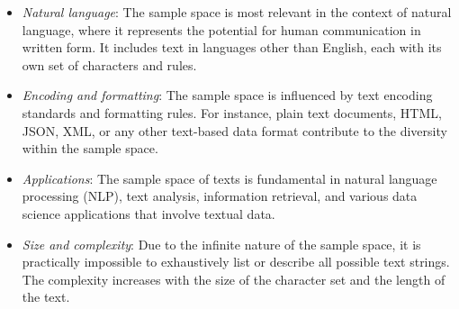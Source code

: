 \documentclass{tufte-handout}
\begin{document}
\begin{enumerate}
\begin{itemize}
\item \textit{Natural language}: The sample space is most relevant in the context of natural language, where it represents the potential for human communication in written form. It includes text in languages other than English, each with its own set of characters and rules.

\item \textit{Encoding and formatting}: The sample space is influenced by text encoding standards and formatting rules. For instance, plain text documents, HTML, JSON, XML, or any other text-based data format contribute to the diversity within the sample space.

\item \textit{Applications}: The sample space of texts is fundamental in natural language processing (NLP), text analysis, information retrieval, and various data science applications that involve textual data.

\item \textit{Size and complexity}: Due to the infinite nature of the sample space, it is practically impossible to exhaustively list or describe all possible text strings. The complexity increases with the size of the character set and the length of the text.


\end{itemize}
\end{enumerate}
\end{document}
